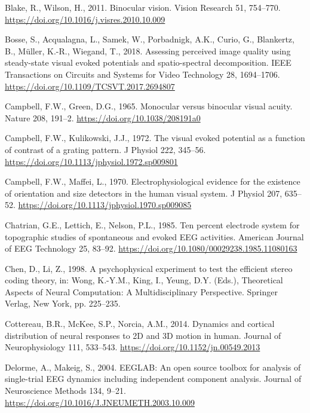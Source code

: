 \documentclass[
  12pt,
]{article}
\newlength{\cslhangindent}
\newenvironment{CSLReferences}[2] %
 {\begin{list}{}{%
  \setlength{\itemindent}{0pt}
  \setlength{\leftmargin}{0pt}
  \setlength{\parsep}{0pt}
  \ifodd #1
   \setlength{\leftmargin}{\cslhangindent}
   \setlength{\itemindent}{-1\cslhangindent}
  \fi
  \setlength{\itemsep}{#2\baselineskip}}}
 {\end{list}}
\begin{document}
\begin{CSLReferences}{1}{0}
Blake, R., Wilson, H., 2011. Binocular vision. Vision Research 51,
754--770. \url{https://doi.org/10.1016/j.visres.2010.10.009}

Bosse, S., Acqualagna, L., Samek, W., Porbadnigk, A.K., Curio, G.,
Blankertz, B., Müller, K.-R., Wiegand, T., 2018. Assessing perceived
image quality using steady-state visual evoked potentials and
spatio-spectral decomposition. IEEE Transactions on Circuits and Systems
for Video Technology 28, 1694--1706.
\url{https://doi.org/10.1109/TCSVT.2017.2694807}

Campbell, F.W., Green, D.G., 1965. Monocular versus binocular visual
acuity. Nature 208, 191--2. \url{https://doi.org/10.1038/208191a0}

Campbell, F.W., Kulikowski, J.J., 1972. The visual evoked potential as a
function of contrast of a grating pattern. J Physiol 222, 345--56.
\url{https://doi.org/10.1113/jphysiol.1972.sp009801}

Campbell, F.W., Maffei, L., 1970. Electrophysiological evidence for the
existence of orientation and size detectors in the human visual system.
J Physiol 207, 635--52.
\url{https://doi.org/10.1113/jphysiol.1970.sp009085}

Chatrian, G.E., Lettich, E., Nelson, P.L., 1985. Ten percent electrode
system for topographic studies of spontaneous and evoked EEG activities.
American Journal of EEG Technology 25, 83--92.
\url{https://doi.org/10.1080/00029238.1985.11080163}

Chen, D., Li, Z., 1998. A psychophysical experiment to test the
efficient stereo coding theory, in: Wong, K.-Y.M., King, I., Yeung, D.Y.
(Eds.), Theoretical Aspects of Neural Computation: A Multidisciplinary
Perspective. Springer Verlag, New York, pp. 225--235.

Cottereau, B.R., McKee, S.P., Norcia, A.M., 2014. Dynamics and cortical
distribution of neural responses to 2D and 3D motion in human. Journal
of Neurophysiology 111, 533--543.
\url{https://doi.org/10.1152/jn.00549.2013}

Delorme, A., Makeig, S., 2004. EEGLAB: An open source toolbox for
analysis of single-trial EEG dynamics including independent component
analysis. Journal of Neuroscience Methods 134, 9--21.
\url{https://doi.org/10.1016/J.JNEUMETH.2003.10.009}


\end{CSLReferences}
\end{document}
